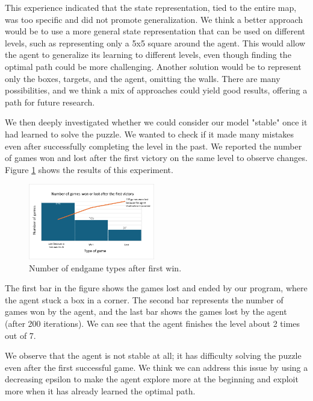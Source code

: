 \documentclass[10pt,twocolumn]{article}
\begin{document}
This experience indicated that the state representation, tied to the entire map, was too specific and did not promote generalization. We think a better approach would be to use a more general state representation that can be used on different levels, such as representing only a 5x5 square around the agent. This would allow the agent to generalize its learning to different levels, even though finding the optimal path could be more challenging. Another solution would be to represent only the boxes, targets, and the agent, omitting the walls. There are many possibilities, and we think a mix of approaches could yield good results, offering a path for future research.

We then deeply investigated whether we could consider our model "stable" once it had learned to solve the puzzle. We wanted to check if it made many mistakes even after successfully completing the level in the past. We reported the number of games won and lost after the first victory on the same level to observe changes. Figure \ref{fig:number_of_game_won} shows the results of this experiment.

\begin{figure}[ht]
    \centering
    \includegraphics[width=0.49\textwidth]{Images/number_of_game_won.png}
    \caption{Number of endgame types after first win.}
    \label{fig:number_of_game_won}
\end{figure}

The first bar in the figure shows the games lost and ended by our program, where the agent stuck a box in a corner. The second bar represents the number of games won by the agent, and the last bar shows the games lost by the agent (after 200 iterations). We can see that the agent finishes the level about 2 times out of 7.

We observe that the agent is not stable at all; it has difficulty solving the puzzle even after the first successful game. We think we can address this issue by using a decreasing epsilon to make the agent explore more at the beginning and exploit more when it has already learned the optimal path.
\end{document}
